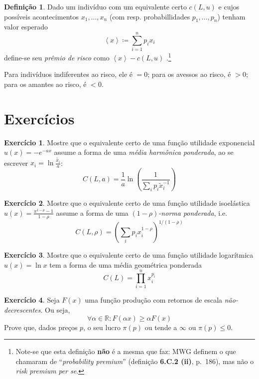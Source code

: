\documentclass[12pt]{article}
\numberwithin{equation}{section}
\theoremstyle{plain}
\theoremstyle{definition}
\newtheorem{definition}[theorem]{Definição}
\newtheorem{exercise}{Exercício}[section]
\theoremstyle{remark}
\begin{document}
\begin{definition}
Dado um indivíduo com um equivalente certo \(c(L, u)\) e cujos possíveis
acontecimentos \(x_{1},\dots,x_{n}\) (com resp. probabillidades
\(p_{1},\dots,p_{n}\)) tenham valor esperado
\[
\left<x\right> \coloneqq \sum \limits_{i=1}^{n} p_{i} x_{i}
\]
define-se seu \textit{prêmio de risco} como
\(\left< x \right> - c(L,u)\)
\parencite[, p. 191]{Cowell2004}.\footnote{Note-se que esta definição
  \textbf{não} é a mesma que \textcite{Mas-Colell1995} faz: MWG definem
  o que chamaram de ``\textit{probability premium}'' (definição
  \textbf{6.C.2 (ii)}, p.~186), mas não o \textit{risk premium}
  \textit{per se}.}

Para indivíduos indiferentes ao risco, ele é \(= 0\); para os avessos ao
risco, é \(>0\); para os amantes ao risco, é \(<0\).
\end{definition}

\hypertarget{exercuxedcios}{%
\section{Exercícios}\label{exercuxedcios}}

\begin{exercise}
Mostre que o equivalente certo de uma função utilidade exponencial
\(u(x) = - e^{-ax}\) assume a forma de uma \textit{média harmônica
ponderada}, ao se escrever \(x_i = \ln \frac{\tilde{x_{i}}}{a}\):
\[
C(L, a) = \frac{1}{a} \ln \left( \frac{1}{\sum \limits_{i} p_{i} \tilde{x}_{i}^{-1}} \right)
\]

\end{exercise}

\begin{exercise}
Mostre que o equivalente certo de uma função utilidade isoelástica
\(u(x) = \frac{x^{1-\rho}-1}{1-\rho}\) assume a forma de uma
\textit{\((1-\rho)\)-norma ponderada}, i.e.~
\[
   C(L, \rho) = \left( \sum \limits_{i} p_{i} x_{i}^{1-\rho} \right)^{1/(1-\rho)}
   \]

\end{exercise}

\begin{exercise}
Mostre que o equivalente certo de uma função utilidade logarítmica
\(u(x) = \ln x\) tem a forma de uma média geométrica ponderada
\[
C(L) = \prod \limits_{i=1}^{n} x_{i}^{p_{i}}
\]

\end{exercise}

\begin{exercise}
\parencite[, p. 135-6]{Mas-Colell1995} Seja \(F(x)\) uma função produção
com retornos de escala \textit{não-decrescentes}. Ou seja,
\[
\forall \alpha \in \mathbb{R}: F(\alpha x) \geq \alpha F(x)
\]
Prove que, dados preços \(p\), o seu lucro \(\pi(p)\) ou tende a
\(\infty\) ou \(\pi(p) \leq 0\).
\end{exercise}
\end{document}
